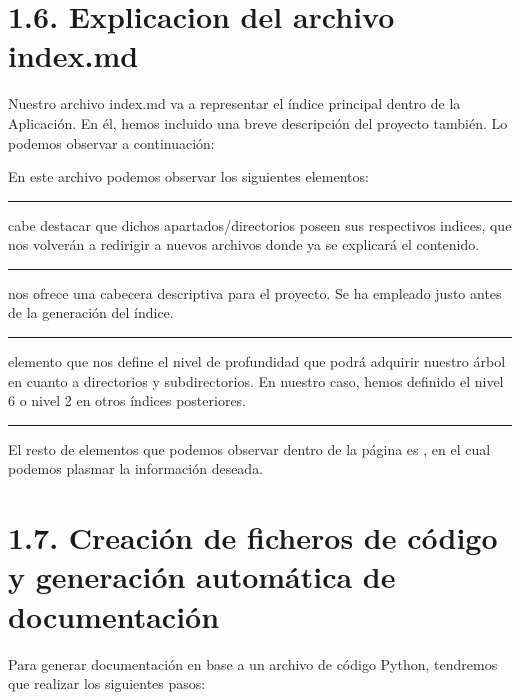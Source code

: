 \documentclass[a4paper,10pt,spanish]{sphinxmanual}
\begin{document}
\sphinxstepscope


\section{1.6. Explicacion del archivo index.md}
\label{\detokenize{1_configuracion_inicial/explicacion_indexmd:explicacion-del-archivo-index-md}}\label{\detokenize{1_configuracion_inicial/explicacion_indexmd::doc}}
\sphinxAtStartPar
Nuestro archivo index.md va a representar el índice principal dentro de la Aplicación. En él, hemos incluido una breve descripción del proyecto también. Lo podemos observar a continuación:

\sphinxAtStartPar
{}

\sphinxAtStartPar
En este archivo podemos observar los siguientes elementos:

\sphinxAtStartPar
{}


\bigskip\hrule\bigskip


\sphinxAtStartPar
{} cabe destacar que dichos apartados/directorios poseen sus respectivos indices, que nos volverán a redirigir a nuevos archivos  donde ya se explicará el contenido.


\bigskip\hrule\bigskip


\sphinxAtStartPar
{} nos ofrece una cabecera descriptiva para el proyecto. Se ha empleado justo antes de la generación del índice.


\bigskip\hrule\bigskip


\sphinxAtStartPar
{} elemento que nos define el nivel de profundidad que podrá adquirir nuestro árbol en cuanto a directorios y subdirectorios. En nuestro caso, hemos definido el nivel 6 o nivel 2 en otros índices posteriores.


\bigskip\hrule\bigskip


\sphinxAtStartPar
El resto de elementos que podemos observar dentro de la página es , en el cual podemos plasmar la información deseada.

\sphinxstepscope


\section{1.7. Creación de ficheros de código y generación automática de documentación}
\label{\detokenize{1_configuracion_inicial/ficheros_documentacion:creacion-de-ficheros-de-codigo-y-generacion-automatica-de-documentacion}}\label{\detokenize{1_configuracion_inicial/ficheros_documentacion::doc}}
\sphinxAtStartPar
Para generar documentación en base a un archivo de código Python, tendremos que realizar los siguientes pasos:
\end{document}
